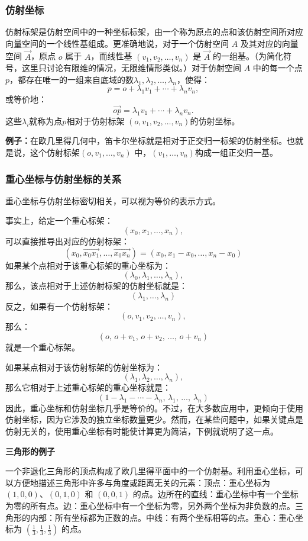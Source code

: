 \subsubsection{仿射坐标}
仿射标架是仿射空间中的一种坐标标架，由一个称为原点的点和该仿射空间所对应向量空间的一个线性基组成。更准确地说，对于一个仿射空间 $A$ 及其对应的向量空间 $\overrightarrow{A}$，原点 $o$ 属于 $A$，而线性基 $(v_1, v_2, \dots, v_n)$ 是 $\overrightarrow{A}$ 的一组基。（为简化符号，这里只讨论有限维的情况，无限维情形类似。）对于仿射空间 $A$ 中的每一个点 $p$，都存在唯一的一组来自底域的数$\lambda_1, \lambda_2, \dots, \lambda_n$，使得：
$$
p = o + \lambda_1 v_1 + \cdots + \lambda_n v_n,~
$$
或等价地：
$$
\overrightarrow{op} = \lambda_1 v_1 + \cdots + \lambda_n v_n.~
$$
这些$\lambda_i$就称为点$p$相对于仿射标架 $(o, v_1, v_2, \dots, v_n)$的仿射坐标。

\textbf{例子：}在欧几里得几何中，笛卡尔坐标就是相对于正交归一标架的仿射坐标。也就是说，这个仿射标架$(o, v_1, \dots, v_n)$ 中，$(v_1, \dots, v_n)$构成一组正交归一基。
\subsubsection{重心坐标与仿射坐标的关系}
重心坐标与仿射坐标密切相关，可以视为等价的表示方式。

事实上，给定一个重心标架：
$$
(x_0, x_1, \dots, x_n),~
$$
可以直接推导出对应的仿射标架：
$$
(x_0, \overrightarrow{x_0x_1}, \dots, \overrightarrow{x_0x_n})
= (x_0, x_1 - x_0, \dots, x_n - x_0)~
$$
如果某个点相对于该重心标架的重心坐标为：
$$
(\lambda_0, \lambda_1, \dots, \lambda_n),~
$$
那么，该点相对于上述仿射标架的仿射坐标就是：
$$
(\lambda_1, \dots, \lambda_n)~
$$
反之，如果有一个仿射标架：
$$
(o, v_1, v_2, \dots, v_n),~
$$
那么：
$$
(o,\, o+v_1,\, o+v_2,\, \dots,\, o+v_n)~
$$
就是一个重心标架。

如果某点相对于该仿射标架的仿射坐标为：
$$
(\lambda_1, \lambda_2, \dots, \lambda_n),~
$$
那么它相对于上述重心标架的重心坐标就是：
$$
(1 - \lambda_1 - \cdots - \lambda_n,\, \lambda_1,\, \dots,\, \lambda_n)~
$$
因此，重心坐标和仿射坐标几乎是等价的。不过，在大多数应用中，更倾向于使用仿射坐标，因为它涉及的独立坐标数量更少。然而，在某些问题中，如果关键点是仿射无关的，使用重心坐标有时能使计算更为简洁，下例就说明了这一点。

\textbf{三角形的例子}

一个非退化三角形的顶点构成了欧几里得平面中的一个仿射基。利用重心坐标，可以方便地描述三角形中许多与角度或距离无关的元素：顶点：重心坐标为 $(1, 0, 0)$、$(0, 1, 0)$ 和 $(0, 0, 1)$ 的点。边所在的直线：重心坐标中有一个坐标为零的所有点。边：重心坐标中有一个坐标为零，另外两个坐标为非负数的点。三角形的内部：所有坐标都为正数的点。中线：有两个坐标相等的点。重心：重心坐标为 $\left(\tfrac{1}{3}, \tfrac{1}{3}, \tfrac{1}{3}\right)$ 的点。

